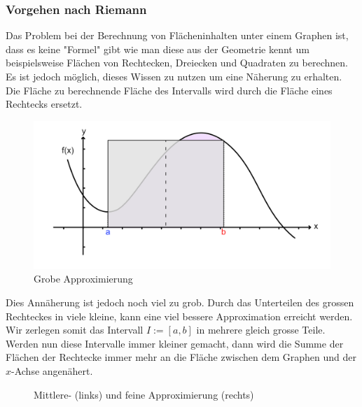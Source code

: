 \documentclass{fhnwreport} %
\begin{document}
\subsubsection{Vorgehen nach Riemann \cite{Riemann2020}}
Das Problem bei der Berechnung von Flächeninhalten unter einem Graphen ist, dass es keine "Formel" gibt wie man diese aus der Geometrie kennt um beispielsweise Flächen von Rechtecken, Dreiecken und Quadraten zu berechnen. Es ist jedoch möglich, dieses Wissen zu nutzen um eine Näherung zu erhalten. Die Fläche zu berechnende Fläche des Intervalls wird durch die Fläche eines Rechtecks ersetzt.	
\begin{figure}[!h]
\centering
\includegraphics{grobe-approximierung-riemann.png}
\caption{Grobe Approximierung}
\label{Grobe Approximierung}
\end{figure}

Dies Annäherung ist jedoch noch viel zu grob. Durch das Unterteilen des grossen Rechteckes in viele kleine, kann eine viel bessere Approximation erreicht werden. Wir zerlegen somit das Intervall $I := [a,b]$ in mehrere gleich grosse Teile. Werden nun diese Intervalle immer kleiner gemacht, dann wird die Summe der Flächen der Rechtecke immer mehr an die Fläche zwischen dem Graphen und der $x$-Achse angenähert.

\begin{figure}[!h]
\caption{Mittlere- (links) und feine Approximierung (rechts)}
\label{Mittlere- (links) und feine Approximierung (rechts)}
\end{figure}
\end{document}
